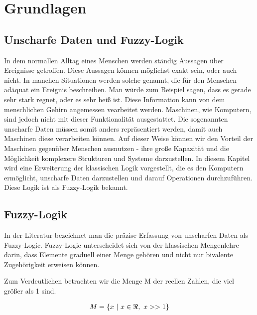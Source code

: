 \chapter{Grundlagen}


\section{Unscharfe Daten und Fuzzy-Logik}
In dem normallen Alltag eines Menschen werden ständig Aussagen über Ereignisse getroffen. Diese Aussagen können möglichst exakt sein, oder auch nicht. In manchen Situationen werden solche genannt, die für den Menschen adäquat ein Ereignis beschreiben. Man würde zum Beispiel sagen, dass es gerade sehr stark regnet, oder es sehr heiß ist. Diese Information kann von dem menschlichen Gehirn angemessen vearbeitet werden. Maschinen, wie Komputern, sind jedoch nicht mit dieser Funktionalität ausgestattet. Die sogenannten unscharfe Daten müssen somit anders repräsentiert werden, damit auch Maschinen diese verarbeiten können. Auf dieser Weise können wir den Vorteil der Maschinen gegenüber Menschen ausnutzen - ihre große Kapazität und die Möglichkeit komplexere Strukturen und Systeme darzustellen. In diesem Kapitel wird eine Erweiterung der klassischen Logik vorgestellt, die es den Komputern ermöglicht, unscharfe Daten darzustellen und darauf Operationen durchzuführen. Diese Logik ist als Fuzzy-Logik bekannt.

\section{Fuzzy-Logik}\label{fuzzy_logik}


In der Literatur bezeichnet man die präzise Erfassung von unscharfen Daten als Fuzzy-Logic. Fuzzy-Logic unterscheidet sich von der klassischen Mengenlehre darin, dass Elemente graduell einer Menge gehören und nicht nur bivalente Zugehörigkeit erweisen können.

Zum Verdeutlichen betrachten wir die Menge M der reellen Zahlen, die viel größer als 1 sind.

\begin{align}
\centering
M = \{ x \ |\ x \in \Re,\ x >> 1\}
\end{align}

